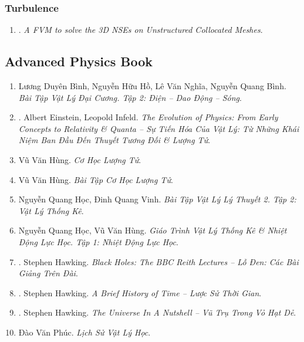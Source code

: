 \documentclass{article}
\begin{document}
\subsubsection{Turbulence}

\begin{enumerate}
	\item \cite{Perron_Boivin_Herard2004}. \textit{A FVM to solve the 3{D} NSEs on Unstructured Collocated Meshes}.\hfill{\sf[reading]}
\end{enumerate}


\subsection{Advanced Physics Book}

\begin{enumerate}
	\item Lương Duyên Bình, Nguyễn Hữu Hồ, Lê Văn Nghĩa, Nguyễn Quang Bình. \textit{Bài Tập Vật Lý Đại Cương. Tập 2: Điện -- Dao Động -- Sóng}.
	\item \cite{Einstein_Infeld_tien_hoa_Vat_Ly}. Albert Einstein, Leopold Infeld. \textit{The Evolution of Physics: From Early Concepts to Relativity \& Quanta -- Sự Tiến Hóa Của Vật Lý: Từ Những Khái Niệm Ban Đầu Đến Thuyết Tương Đối \& Lượng Tử}.\hfill{\sf[done]}
	\item Vũ Văn Hùng. \textit{Cơ Học Lượng Tử}.
	\item Vũ Văn Hùng. \textit{Bài Tập Cơ Học Lượng Tử}.
	\item Nguyễn Quang Học, Đinh Quang Vinh. \textit{Bài Tập Vật Lý Lý Thuyết 2. Tập 2: Vật Lý Thống Kê}.
	\item Nguyễn Quang Học, Vũ Văn Hùng. \textit{Giáo Trình Vật Lý Thống Kê \& Nhiệt Động Lực Học. Tập 1: Nhiệt Động Lực Học}.
	\item \cite{Hawking_bbc}. Stephen Hawking. \textit{Black Holes: The BBC Reith Lectures -- Lỗ Đen: Các Bài Giảng Trên Đài}.\hfill{\sf[done]}
	\item \cite{Hawking_lstg}. Stephen Hawking. \textit{A Brief History of Time -- Lược Sử Thời Gian}.\hfill{\sf[done]}
	\item \cite{Hawking_vttvhd}. Stephen Hawking. \textit{The Universe In A Nutshell -- Vũ Trụ Trong Vỏ Hạt Dẻ}.\hfill{\sf[done]}
	\item Đào Văn Phúc. \textit{Lịch Sử Vật Lý Học}.
\end{enumerate}
\end{document}
